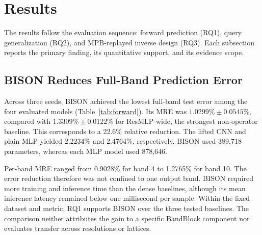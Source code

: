 
\section{Results}

The results follow the evaluation sequence: forward prediction (RQ1), query
generalization (RQ2), and MPB-replayed inverse design (RQ3). Each subsection
reports the primary finding, its quantitative support, and its evidence scope.

\subsection{BISON Reduces Full-Band Prediction Error}

Across three seeds, BISON achieved the lowest full-band test error among the
four evaluated models (Table~\ref{tab:forward}). Its MRE was
\(1.0299\%\pm0.0545\%\), compared with
\(1.3309\%\pm0.0122\%\) for ResMLP-wide, the strongest non-operator
baseline. This corresponds to a 22.6\% relative reduction. The lifted CNN and
plain MLP yielded 2.2234\% and 2.4764\%, respectively. BISON used 389,718
parameters, whereas each MLP model used 878,646.

\begin{table}[t]
  \caption{Forward evaluation on 625 test structures. MRE and training time are
  mean\(\pm\)standard deviation over seeds 0, 1, and 2; latency is the
  across-seed mean. MRE evaluates bands 2--10.}
  \label{tab:forward}
  \centering
  \small
\end{table}

Per-band MRE ranged from 0.9028\% for band 4 to 1.2765\% for band 10.
The error reduction therefore was not confined to one output band. BISON
required more training and inference time than the dense baselines, although
its mean inference latency remained below one millisecond per sample. Within
the fixed dataset and metric, RQ1 supports BISON over the three tested
baselines. The comparison neither attributes the gain to a specific BandBlock
component nor evaluates transfer across resolutions or lattices.

